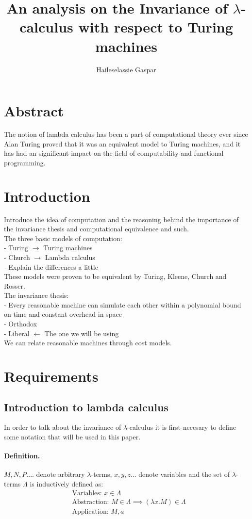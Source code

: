 \documentclass[12pt]{article}
\title{An analysis on the Invariance of $\lambda$-calculus with respect to Turing machines}
\author{Haileselassie Gaspar}
\begin{document}
\maketitle

\section{Abstract}
The notion of lambda calculus has been a part of computational theory ever since Alan Turing proved that it was an equivalent model to Turing machines, and it has had an significant impact on the field of computability and functional programming.
\section{Introduction}
Introduce the idea of computation and the reasoning behind the importance of the invariance thesis and computational equivalence and such. \\
The three basic models of computation: \\
- Turing $\rightarrow$ Turing machines \\
- Church $\rightarrow$ Lambda calculus \\
  - Explain the differences a little \\
These models were proven to be equivalent by Turing, Kleene, Church and Rosser. \\
The invariance thesis: \\
 - Every reasonable machine can simulate each other within a polynomial bound on time and constant overhead in space \\
   - Orthodox \\
   - Liberal $\leftarrow$ The one we will be using \\
We can relate reasonable machines through cost models. \\
\section{Requirements}
\subsection{Introduction to lambda calculus}
In order to talk about the invariance of $\lambda$-calculus it is first necesary to define some notation that will be used in this paper.
\paragraph{Definition.}$M, N, P....$ denote arbitrary $\lambda$-terms, $x,y,z...$ denote variables and
the set of $\lambda$-terms $\Lambda$ is inductively defined as:
\begin{equation}
  \begin{split}
  & \text{Variables: } x \in \Lambda \\
  & \text{Abstraction: } M \in \Lambda \implies ( \lambda x.M ) \in \Lambda \\
  & \text{Application: } M, a
  \end{split}
\end{equation}
\end{document}

